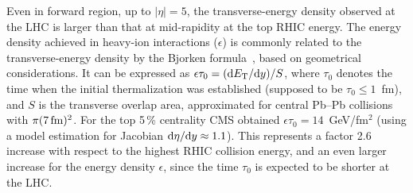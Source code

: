 Even in forward region, up to $|\eta| = 5$, the transverse-energy density observed at the LHC is larger than that at mid-rapidity at the top RHIC energy. The energy density achieved in heavy-ion interactions ($\epsilon$) is commonly related to the transverse-energy density by the Bjorken formula~\cite{Bjorken:1982qr}, based on geometrical considerations. It can be expressed as $\epsilon \tau_{0} = ({\rm d}E_{\rm T}/{\rm d}y) / S$, where $\tau_{0}$ denotes the time when the initial thermalization was established (supposed to be $\tau_{0} \leq 1$~fm), and $S$ is the transverse overlap area, approximated for central Pb--Pb collisions with $\pi (7\,{\rm fm})^2$. For the top 5\,\% centrality CMS obtained $\epsilon \tau_{0} = 14$~GeV/fm$^2$ (using a model estimation for Jacobian ${\rm d}\eta/{\rm d}y \approx 1.1$). This represents a factor 2.6 increase with respect to the highest RHIC collision energy, and an even larger increase for the energy density $\epsilon$, since the time $\tau_{0}$ is expected to be shorter at the LHC.
